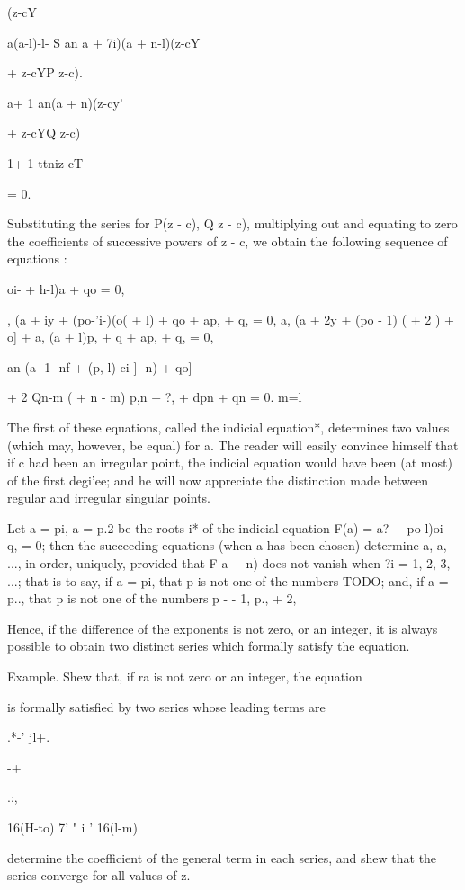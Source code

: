 (z-cY

a(a-l)-l- S an a + 7i)(a + n-l)(z-cY

+ z-cYP z-c).

a+ 1 an(a + n)(z-cy'

+ z-cYQ z-c)

1+ 1 ttniz-cT

= 0.

Substituting the series for P(z - c), Q z - c), multiplying out and
equating to zero the coefficients of successive powers of z - c, we
obtain the following sequence of equations :

oi- + h-l)a + qo = 0,

, (a + iy + (po-'i-)(o( + l) + qo + ap, + q, = 0, a, (a + 2y + (po -
1) ( + 2 ) + o] + a, (a + l)p, + q + ap, + q, = 0,

an (a -1- nf + (p,-l) ci-]- n) + qo]

+ 2 Qn-m ( + n - m) p,n + ?, + dpn + qn = 0. m=l

The first of these equations, called the indicial equation*,
determines two values (which may, however, be equal) for a. The reader
will easily convince himself that if c had been an irregular point,
the indicial equation would have been (at most) of the first degi'ee;
and he will now appreciate the distinction made between regular and
irregular singular points.

Let a = pi, a = p.2 be the roots i* of the indicial equation F(a) = a?
+ po-l)oi + q, = 0; then the succeeding equations (when a has been
chosen) determine a, a, ..., in order, uniquely, provided that F a +
n) does not vanish when ?i = 1, 2, 3, ...; that is to say, if a = pi,
that p is not one of the numbers TODO; and, if a =
p.., that p is not one of the numbers p - - 1, p., + 2,

Hence, if the difference of the exponents is not zero, or an integer,
it is always possible to obtain two distinct series which formally
satisfy the equation.

Example. Shew that, if ra is not zero or an integer, the equation

is formally satisfied by two series whose leading terms are

.*-' jl+.

-+

.:,

16(H-to) 7' " i ' 16(l-m)

determine the coefficient of the general term in each series, and shew
that the series converge for all values of z.

